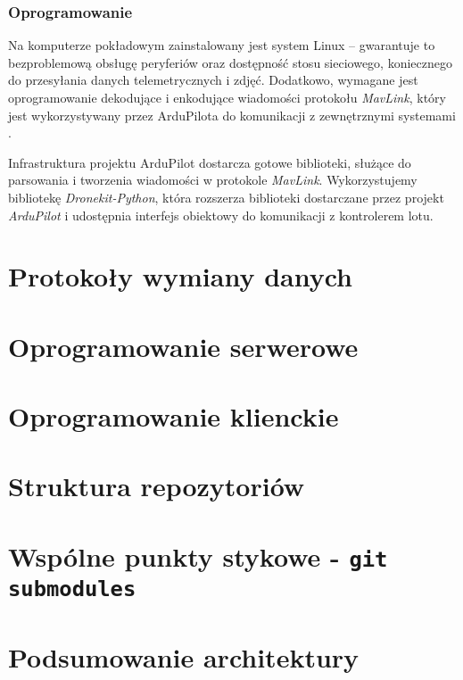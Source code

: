 \subsubsection{Oprogramowanie}

Na komputerze pokładowym zainstalowany jest system Linux -- gwarantuje to bezproblemową
obsługę peryferiów oraz dostępność stosu sieciowego, koniecznego do przesyłania 
danych telemetrycznych i zdjęć.
Dodatkowo, wymagane jest oprogramowanie dekodujące
i enkodujące wiadomości protokołu \textit{MavLink}, który jest wykorzystywany przez 
ArduPilota do komunikacji z zewnętrznymi systemami \cite{ardupilot_mavlink}.

Infrastruktura projektu ArduPilot dostarcza gotowe biblioteki, służące do
parsowania i tworzenia wiadomości w protokole \textit{MavLink}. Wykorzystujemy bibliotekę
\textit{Dronekit-Python}, która rozszerza biblioteki dostarczane przez projekt
\textit{ArduPilot} i udostępnia interfejs obiektowy do komunikacji z kontrolerem lotu.

\section{Protokoły wymiany danych}

\section{Oprogramowanie serwerowe}

\section{Oprogramowanie klienckie}

\section{Struktura repozytoriów}

\section{Wspólne punkty stykowe - \texttt{git submodules}}


\section{Podsumowanie architektury}

